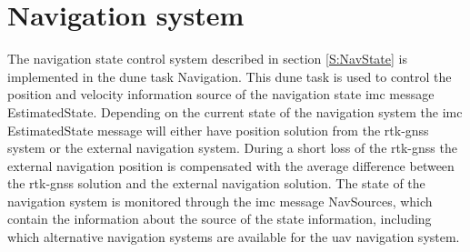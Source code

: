 \section{Navigation system}\label{IMP:NavSys}
The navigation state control system described in section \ref{S:NavState} is implemented in the \gls{dune} task Navigation. This \gls{dune} task is used to control the position and velocity information source of the navigation state \gls{imc} message EstimatedState. Depending on the current state of the navigation system the \gls{imc} EstimatedState message will either have position solution from the \gls{rtk-gnss} system or the external navigation system. During a short loss of the \gls{rtk-gnss} the external navigation position is compensated with the average difference between the \gls{rtk-gnss} solution and the external navigation solution. The state of the navigation system is monitored through the \gls{imc} message NavSources, which contain the information about the source of the state information, including which alternative navigation systems are available for the \gls{uav} navigation system.
